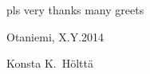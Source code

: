 pls very thanks many greets

\vspace{5cm}
Otaniemi, X.Y.2014

\vspace{5mm}
{\hfill Konsta K.\ Hölttä \hspace{1cm}}
